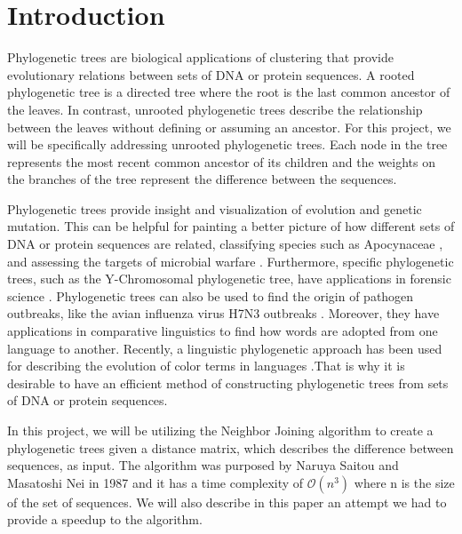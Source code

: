 \section{Introduction}

Phylogenetic trees are biological applications of clustering that provide evolutionary relations between sets of DNA or protein sequences. A rooted phylogenetic tree is a directed tree where the root is the last common ancestor of the leaves. In contrast, unrooted phylogenetic trees describe the relationship between the leaves without defining or assuming an ancestor. For this project, we will be specifically addressing unrooted phylogenetic trees. Each node in the tree represents the most recent common ancestor of its children and the weights on the branches of the tree represent the difference between the sequences.

Phylogenetic trees provide insight and visualization of evolution and genetic mutation. This can be helpful for painting a better picture of how different sets of DNA or protein sequences are related, classifying species such as Apocynaceae \cite{saitou1987neighbor}, and assessing the targets of microbial warfare \cite{riley2003}. Furthermore, specific phylogenetic trees, such as the Y-Chromosomal phylogenetic tree, have applications in forensic science \cite{van2013}. Phylogenetic trees can also be used to find the origin of pathogen outbreaks, like the avian influenza virus H7N3 outbreaks \cite{lu2014}. Moreover, they have applications in comparative linguistics to find how words are adopted from one language to another. Recently, a linguistic phylogenetic approach has been used for describing the evolution of color terms in languages \cite{haynie2016}.That is why it is desirable to have an efficient method of constructing phylogenetic trees from sets of DNA or protein sequences.

In this project, we will be utilizing the Neighbor Joining algorithm to create a phylogenetic trees given a distance matrix, which describes the difference between sequences, as input. The algorithm was purposed by Naruya Saitou and Masatoshi Nei in 1987 \cite{saitou1987neighbor} and it has a time complexity of $\mathcal{O}(n^3)$ where n is the size of the set of sequences. We will also describe in this paper an attempt we had to provide a speedup to the algorithm.
